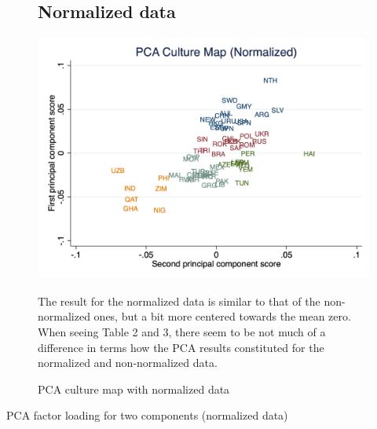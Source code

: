 \documentclass[10pt,leqno]{article}
\begin{document}
\begin{figure}  [h!]
\subsection{Normalized data}
\begin{center}
\caption{PCA culture map with normalized data}
\includegraphics[scale=0.25]{PCA_CultureMap_NOR.png}
\end{center}
The result for the normalized data is similar to that of the non-normalized ones, but a bit more centered towards the mean zero. When seeing Table 2 and 3, there seem to be not much of a difference in terms how the PCA results constituted for the normalized and non-normalized data. 
\end{figure} 

\begin{table}[tbp]
\centering
\caption{PCA factor loading for two components (normalized data)}
\begin{adjustbox}{width=0.7\textwidth}
\small

\end{adjustbox}
\end{table}
\end{document}
